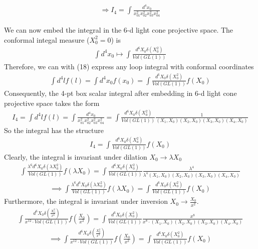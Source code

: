 \documentclass[12pt]{scrartcl}
\begin{document}
{\begin{align}
    \Rightarrow I_4 = \int \frac{d^4x_0}{x_{01}^2x_{02}^2x_{03}^2x_{04}^2} 
\end{align}


We can now embed the integral in the 6-d light cone projective space. The conformal integal measure ($X_0^2 =0$) is
\begin{align}
    \int d^4x_0 \mapsto \int \frac{d^6X_0\delta(X_0^2)}{Vol(GL(1))}
\end{align}
Therefore, we can with (18) express any loop integral with conformal coordinates
\begin{align}
    \int d^4l f(l) = \int d^4x_0 f(x_0) = \int \frac{d^6X_0\delta(X_0^2)}{Vol(GL(1))} f(X_0)
\end{align}
Consequently, the 4-pt box scalar integral after embedding in 6-d light cone projective space takes the form
\begin{align}
    I_4 = \int d^4lf(l)= \int \frac{d^4x_0}{x_{01}^2x_{02}^2x_{03}^2x_{04}^2} = \int \frac{d^6X_0\delta(X_0^2)}{Vol(GL(1))}\frac{1}{(X_1,X_0)(X_2,X_0)(X_3,X_0)(X_4,X_0)}
\end{align}
So the integral has the structure
\begin{align}
    I_4 = \int \frac{d^6X_0\delta(X_0^2)}{Vol(GL(1))}f(X_0)
\end{align}
Clearly, the integral is invariant under dilation $X_0 \to \lambda X_0$
\begin{align}
    \int \frac{\lambda^6 d^6X_0\delta(\lambda X_0^2)}{Vol(GL(1))}f(\lambda X_0) = \int  \frac{d^6X_0\delta(X_0^2)}{Vol(GL(1))}\frac{\lambda^4}{\lambda^4 (X_1,X_0)(X_2,X_0)(X_3,X_0)(X_4,X_0)}
\end{align}
\begin{align}
    \implies \int \frac{\lambda^6 d^6X_0\delta(\lambda X_0^2)}{Vol(GL(1))}f(\lambda X_0) = \int \frac{d^6X_0\delta(X_0^2)}{Vol(GL(1))}f(X_0) 
\end{align}
Furthermore, the integral is invariant under inversion $X_0 \to \frac{X_0}{x^2}$. 
\begin{align}
     \int \frac{ d^6X_0\delta(\frac{X_0^2}{x^4})}{x^{12}\cdot Vol(GL(1))}f(\frac{X_0}{x^2}) = \int  \frac{d^6X_0\delta(X_0^2)}{Vol(GL(1))}\frac{x^8}{x^{8}\cdot (X_1,X_0)(X_2,X_0)(X_3,X_0)(X_4,X_0)}
\end{align}
\begin{align}
    \implies \int \frac{ d^6X_0\delta(\frac{X_0^2}{x^4})}{x^{12}\cdot Vol(GL(1))}f(\frac{X_0}{x^2}) = \int \frac{d^6X_0\delta(X_0^2)}{Vol(GL(1))}f(X_0) 

\end{align}}
\end{document}
